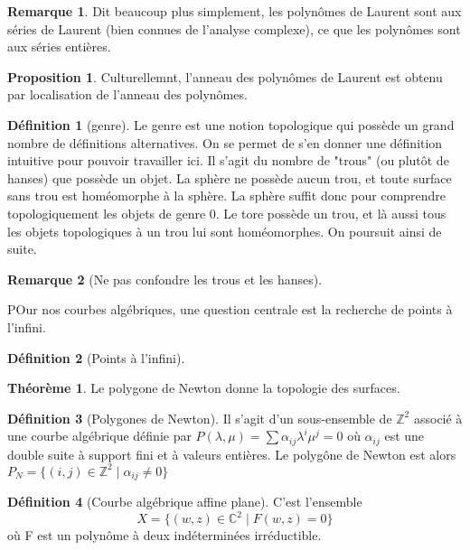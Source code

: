 \documentclass{article}
\newcommand{\C}{\mathbb{C}} %
\newcommand{\Z}{\mathbb{Z}} %
\theoremstyle{definition} %
\newtheorem{defi}{Définition}
\newtheorem{rmq}{Remarque}
\newtheorem{thm}{Théorème}
\newtheorem{prop}{Proposition}
\newcommand{\1}{\mathbb{1}} %
\begin{document}
\begin{rmq}
Dit beaucoup plus simplement, les polynômes de Laurent sont aux séries de Laurent (bien connues de l'analyse complexe), ce que les polynômes sont aux séries entières.
\end{rmq}

\begin{prop}
\label{localisationplnlaurent}
Culturellemnt, l'anneau des polynômes de Laurent est obtenu par localisation de l'anneau des polynômes.
\end{prop}

\begin{defi}[genre]
Le genre est  une notion topologique qui possède un grand nombre de définitions alternatives. On se permet de s'en donner une définition intuitive pour pouvoir travailler ici.
Il s'agit du nombre de "trous" (ou plutôt de hanses) que possède un objet.
La sphère ne possède aucun trou, et toute surface sans trou est homéomorphe à la sphère.
La sphère suffit donc pour comprendre topologiquement les objets de genre 0.
Le tore possède un trou, et là aussi tous les objets topologiques à un trou lui sont homéomorphes.
On poursuit ainsi de suite.
\end{defi}

\begin{rmq}[Ne pas confondre les trous et les hanses]

\end{rmq}

POur nos courbes algébriques, une question centrale est la recherche de points à l'infini.

\begin{defi}[Points à l'infini]

\end{defi}

\begin{thm}
Le polygone de Newton donne la topologie des surfaces.
\end{thm}


\begin{defi}[Polygones de Newton]
Il s'agit d'un sous-ensemble de $\Z^2$ associé à une courbe algébrique définie par $P(\lambda,\mu)=\sum \alpha_{ij} \lambda^i \mu^j=0$ où $\alpha_{ij}$ est une double suite à support fini et à valeurs entières.
Le polygône de Newton est alors $P_N=\{ (i,j) \in \Z^2 \mid \alpha_{ij} \neq 0 \}$
\end{defi}

\begin{defi}[Courbe algébrique affine plane]
C'est l'ensemble 
$$X=\{(w,z) \in \C^2 \mid F(w,z)=0\}$$
où F est un polynôme à deux indéterminées irréductible.
\end{defi}
\end{document}

